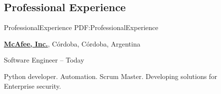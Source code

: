 \documentclass[letterpaper,MMMyyyy,nonstop]{simpleresumecv}
\begin{document}
\begin{body}

%
%


%
%


\section
{Professional \newline
	Experience}
{ProfessionalExperience}
{PDF:ProfessionalExperience}

\href{http://www.mcafee.com}
{\textbf{McAfee, Inc.}},
Córdoba, Córdoba, Argentina

\GapNoBreak
\BulletItem
Software Engineer
\hfill
{} --
Today
\begin{detail}
	\SubBulletItem
	Python developer.
	\SubBulletItem
	Automation.
	\SubBulletItem
	Scrum Master.
	\SubBulletItem
	Developing solutions for Enterprise security.
\end{detail}



\end{body}
\end{document}
